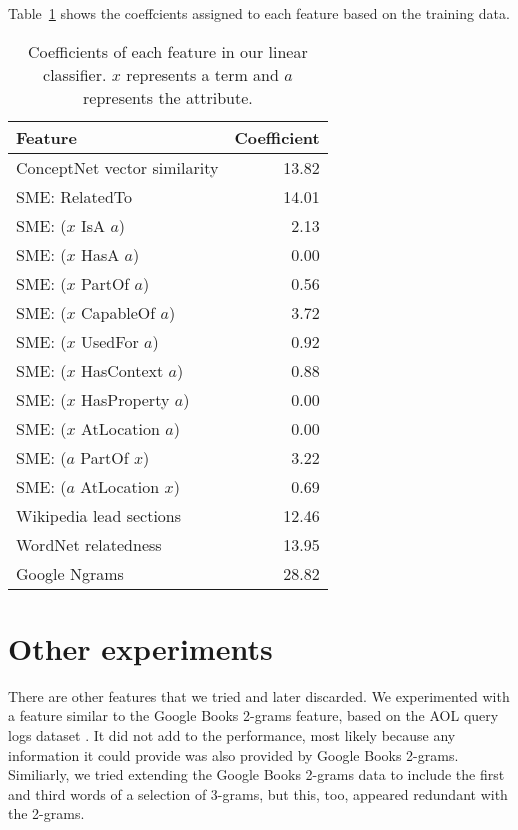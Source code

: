 \documentclass[11pt,a4paper]{article}
\begin{document}
Table~\ref{table:coefficients} shows the coeffcients assigned to each feature
based on the training data.

\begin{table}[t]
\begin{small}
\begin{tabular}{lr}
\textbf{Feature} & \textbf{Coefficient}\\
\hline
ConceptNet vector similarity	& 13.82\\
SME: RelatedTo			& 14.01\\
SME: ($x$ IsA $a$)			& 2.13\\
SME: ($x$ HasA $a$)			& 0.00\\
SME: ($x$ PartOf $a$)		& 0.56\\
SME: ($x$ CapableOf $a$)		& 3.72\\
SME: ($x$ UsedFor $a$)		& 0.92\\
SME: ($x$ HasContext $a$)		& 0.88\\
SME: ($x$ HasProperty $a$)		& 0.00\\
SME: ($x$ AtLocation $a$)		& 0.00\\
SME: ($a$ PartOf $x$)		& 3.22\\
SME: ($a$ AtLocation $x$)		& 0.69\\
Wikipedia lead sections		& 12.46\\
WordNet relatedness		& 13.95\\
Google Ngrams			& 28.82\\
\end{tabular}
\end{small}
\caption{Coefficients of each feature in our linear classifier.
    $x$ represents a term and $a$ represents the attribute.}
\label{table:coefficients}
\end{table}

\section{Other experiments}

\label{sec:experiments}
There are other features that we tried and later discarded. We experimented
with a feature similar to the Google Books 2-grams feature, based on the AOL
query logs dataset \cite{pass2006}. It did not add to the performance, most
likely because any information it could provide was also provided by Google
Books 2-grams. Similiarly, we tried extending the Google Books 2-grams data to
include the first and third words of a selection of 3-grams, but this, too,
appeared redundant with the 2-grams.
\end{document}
